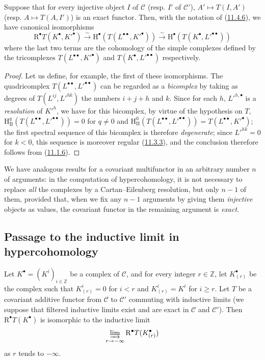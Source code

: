 \begin{proposition}[11.4.7]
\label{0.11.4.7}
Suppose that for every injective object $I$ of $\mathcal C$ (resp. $I'$ of
$\mathcal C'$), $A'\mapsto T(I,A')$ (resp. $A\mapsto T(A,I')$) is an
exact functor. Then, with the notation of
(\hyperref[0.11.4.6]{11.4.6}), we have canonical isomorphisms
\[
  \label{0.11.4.7.1}
  \mathrm R^\bullet T(K^\bullet,K'^\bullet)
  \xrightarrow{\sim}\mathrm H^\bullet(T(L^{\bullet\bullet},K'^\bullet))
  \xrightarrow{\sim}\mathrm H^\bullet(T(K^\bullet,L'^{\bullet\bullet}))
  \tag{11.4.7.1}
\]
where the last two terms are the cohomology of the simple complexes defined
by the tricomplexes $T(L^{\bullet\bullet},K'^\bullet)$ and
$T(K^\bullet,L'^{\bullet\bullet})$ respectively.
\end{proposition}

\begin{proof}
Let us define, for example, the first of these isomorphisms. The quadricomplex
$T(L^{\bullet\bullet},L'^{\bullet\bullet})$ can be regarded as a
\emph{bicomplex} by taking as degrees of $T(L^{ij},L'^{hk})$ the numbers
$i+j+h$ and $k$. Since for each $h$, $L'^{h,\bullet}$ is a
\emph{resolution} of $K'^h$, we have for this bicomplex, by virtue of the hypothesis
on $T$,
$\mathrm H_{\mathrm{II}}^q(T(L^{\bullet\bullet},L'^{\bullet\bullet}))=0$
for $q\neq0$ and
$\mathrm H_{\mathrm{II}}^0(T(L^{\bullet\bullet},L'^{\bullet\bullet}))
=T(L^{\bullet\bullet},K'^\bullet)$; the first spectral sequence of this
bicomplex is therefore \emph{degenerate}; since $L'^{hk}=0$ for $k<0$, this
sequence is moreover regular (\hyperref[0.11.3.3]{11.3.3}), and the
conclusion therefore follows from (\hyperref[0.11.1.6]{11.1.6}).
\end{proof}

We have analogous results for a covariant multifunctor in an arbitrary
number $n$ of arguments: in the computation of hypercohomology, it is not
necessary to replace \emph{all} the complexes by a Cartan--Eilenberg
resolution, but only $n-1$ of them, provided that, when we fix any
$n-1$ arguments by giving them \emph{injective} objects as values,
the covariant functor in the remaining argument is
\emph{exact}.

\subsection{Passage to the inductive limit in hypercohomology}
\label{subsection:0.11.5}

\begin{lemma}[11.5.1]
\label{0.11.5.1}
Let $K^\bullet=(K^i)_{i\in\mathbb Z}$ be a complex of $\mathcal C$, and for
every integer $r\in\mathbb Z$, let $K_{(r)}^\bullet$ be the complex such that
$K_{(r)}^i=0$ for $i<r$ and $K_{(r)}^i=K^i$ for $i\geq r$. Let $T$ be a
covariant additive functor
from $\mathcal C$ to $\mathcal C'$ commuting with
inductive limits (we suppose that filtered inductive limits exist
and are exact in $\mathcal C$ and $\mathcal C'$). Then
$\mathrm R^\bullet T(K^\bullet)$ is isomorphic to the inductive limit
\[
  \varinjlim_{r\to-\infty}\mathrm R^\bullet T(K_{(r)}^\bullet)
\]
as $r$ tends to $-\infty$.
\end{lemma}

